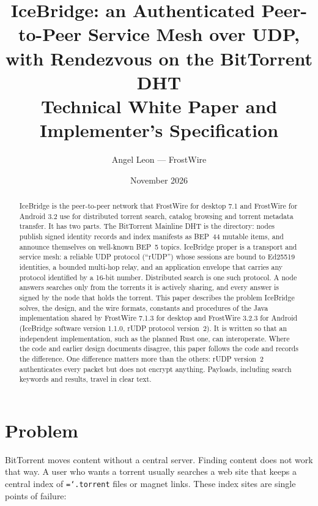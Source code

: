 \documentclass[11pt,a4paper]{article}
\title{IceBridge: an Authenticated Peer-to-Peer Service Mesh over UDP,\\
with Rendezvous on the BitTorrent DHT\\[4pt]
\large Technical White Paper and Implementer's Specification}
\author{Angel Leon --- FrostWire}
\date{November 2026}
\newcommand{\code}[1]{\texttt{\hyphenchar\font=`\-\relax #1}}
\DeclareRobustCommand{\_}{\origunderscore\allowbreak}
\begin{document}
\maketitle

\begin{abstract}
\noindent IceBridge is the peer-to-peer network that FrostWire for desktop 7.1 and FrostWire for Android 3.2 use for distributed
torrent search, catalog browsing and torrent metadata transfer. It has two parts. The
BitTorrent Mainline DHT is the directory: nodes publish signed identity records and index
manifests as BEP~44 mutable items, and announce themselves on well-known BEP~5 topics.
IceBridge proper is a transport and service mesh: a reliable UDP protocol (``rUDP'') whose
sessions are bound to Ed25519 identities, a bounded multi-hop relay, and an application
envelope that carries any protocol identified by a 16-bit number. Distributed search is one
such protocol. A node answers searches only from the torrents it is actively sharing, and
every answer is signed by the node that holds the torrent. This paper describes the problem
IceBridge solves, the design, and the wire formats, constants and procedures of the Java
implementation shared by FrostWire 7.1.3 for desktop and FrostWire 3.2.3 for Android (IceBridge
software version 1.1.0, rUDP protocol version~2). It is written so that an independent implementation, such as the planned Rust
one, can interoperate. Where the code and earlier design documents disagree, this paper
follows the code and records the difference. One difference matters more than the others:
rUDP version~2 authenticates every packet but does not encrypt anything. Payloads,
including search keywords and results, travel in clear text.
\end{abstract}

\tableofcontents
\newpage

\section{Problem}

BitTorrent moves content without a central server. Finding content does not work that way.
A user who wants a torrent usually searches a web site that keeps a central index of
\code{.torrent} files or magnet links. These index sites are single points of failure:
\end{document}
